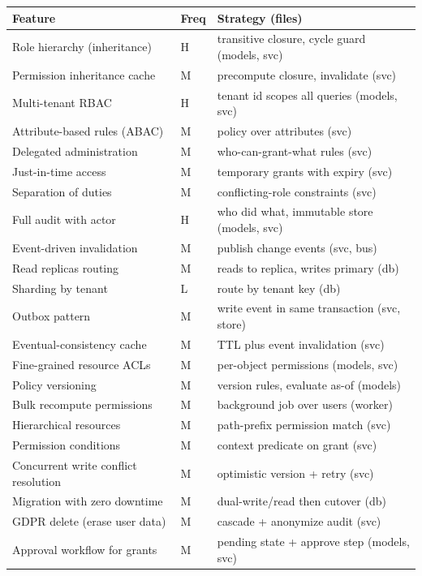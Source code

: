 \documentclass[11pt,a4paper]{report}
\begin{document}
\begin{longtable}{p{} p{} p{}}
\textbf{Feature} & \textbf{Freq} & \textbf{Strategy (files)} \\
\hline
\endhead
Role hierarchy (inheritance) & H & transitive closure, cycle guard (models, svc) \\
Permission inheritance cache & M & precompute closure, invalidate (svc) \\
Multi-tenant RBAC & H & tenant id scopes all queries (models, svc) \\
Attribute-based rules (ABAC) & M & policy over attributes (svc) \\
Delegated administration & M & who-can-grant-what rules (svc) \\
Just-in-time access & M & temporary grants with expiry (svc) \\
Separation of duties & M & conflicting-role constraints (svc) \\
Full audit with actor & H & who did what, immutable store (models, svc) \\
Event-driven invalidation & M & publish change events (svc, bus) \\
Read replicas routing & M & reads to replica, writes primary (db) \\
Sharding by tenant & L & route by tenant key (db) \\
Outbox pattern & M & write event in same transaction (svc, store) \\
Eventual-consistency cache & M & TTL plus event invalidation (svc) \\
Fine-grained resource ACLs & M & per-object permissions (models, svc) \\
Policy versioning & M & version rules, evaluate as-of (models) \\
Bulk recompute permissions & M & background job over users (worker) \\
Hierarchical resources & M & path-prefix permission match (svc) \\
Permission conditions & M & context predicate on grant (svc) \\
Concurrent write conflict resolution & M & optimistic version + retry (svc) \\
Migration with zero downtime & M & dual-write/read then cutover (db) \\
GDPR delete (erase user data) & M & cascade + anonymize audit (svc) \\
Approval workflow for grants & M & pending state + approve step (models, svc) \\

\end{longtable}
\end{document}
